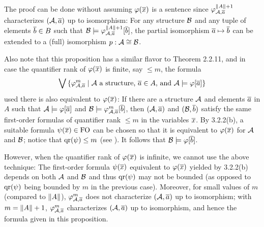 \begin{enumerate}[1.]
The proof can be done without assuming $\varphi(\overline{x})$ is a sentence since $\varphi^{\|A\| + 1}_{\mathcal{A}, \overline{a}}$ characterizes $(\mathcal{A}, \overline{a})$ up to isomorphism: For any structure $\mathcal{B}$ and any tuple of elements $\overline{b} \in B$ such that $\mathcal{B} \models \varphi^{\|A\| + 1}_{\mathcal{A}, \overline{a}}[\overline{b}]$, the partial isomorphism $\overline{a} \mapsto \overline{b}$ can be extended to a (full) isomorphism $p: \mathcal{A} \cong \mathcal{B}$.

Also note that this proposition has a similar flavor to Theorem 2.2.11, and in case the quantifier rank of $\varphi(\overline{x})$ is finite, say $\leq m$, the formula
\[
\blor \sett{\hint{m}{\strct{A}, \vect{a}}}{\mathmode{\strct{A}} a structure, \mathmode{\vect{a} \in A}, and \mathmode{\strct{A} \satis \varphi[\vect{a}]}}
\]
used there is also equivalent to $\varphi(\overline{x})$: If there are a structure $\mathcal{A}$ and elements $\overline{a}$ in $A$ such that $\mathcal{A} \models \varphi[\overline{a}]$ and $\mathcal{B} \models \varphi^{m}_{\mathcal{A}, \overline{a}}[\overline{b}]$, then $(\mathcal{A}, \overline{a})$ and $(\mathcal{B}, \overline{b})$ satisfy the same first-order formulas of quantifier rank $\leq m$ in the variables $\overline{x}$. By 3.2.2(b), a suitable formula $\psi(\vect{x}) \in \folog$ can be chosen so that it is equivalent to $\varphi(\overline{x})$ for $\mathcal{A}$ and $\mathcal{B}$; notice that $\mathrm{qr}(\psi) \leq m$ (see ). It follows that $\mathcal{B} \models \varphi[\overline{b}]$.

However, when the quantifier rank of $\varphi(\overline{x})$ is infinite, we cannot use the above technique: The first-order formula $\psi(\overline{x})$ equivalent to $\varphi(\overline{x})$ yielded by 3.2.2(b) depends on both $\mathcal{A}$ and $\mathcal{B}$ and thus $\mathrm{qr}(\psi)$ may not be bounded (as opposed to $\mathrm{qr}(\psi)$ being bounded by $m$ in the previous case). Moreover, for small values of $m$ (compared to $\|A\|$), $\varphi^{m}_{\mathcal{A}, \overline{a}}$ does not characterize $(\mathcal{A}, \overline{a})$ up to isomorphism; with $m = \|A\| + 1$, $\varphi^{m}_{\mathcal{A}, \overline{a}}$ characterizes $(\mathcal{A}, \overline{a})$ up to isomorphism, and hence the formula given in this proposition.


\end{enumerate}

